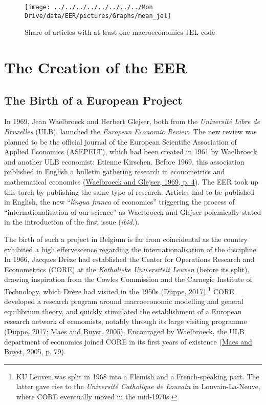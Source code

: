 \documentclass[
  12pt,
  onecolumn]{article}
\begin{document}
\begin{figure}[H]

{\centering \texttt{[image: ../../../../../../../../Mon Drive/data/EER/pictures/Graphs/mean\_jel]} 

}

\caption{Share of articles with at least one macroeconomics JEL code}\label{fig:plot-jel}
\end{figure}

\hypertarget{EER-creation}{%
\section{The Creation of the EER}\label{EER-creation}}

\hypertarget{the-birth-of-a-european-project}{%
\subsection{The Birth of a European Project}\label{the-birth-of-a-european-project}}

In 1969, Jean Waelbroeck and Herbert Glejser, both from the \emph{Université Libre de Bruxelles} (ULB), launched the \emph{European Economic Review}. The new review was planned to be the official journal of the European Scientific Association of Applied Economics (ASEPELT), which had been created in 1961 by Waelbroeck and another ULB economist: Etienne Kirschen. Before 1969, this association published in English a bulletin gathering research in econometrics and mathematical economics (\protect\hyperlink{ref-waelbroeck1969}{Waelbroeck and Glejser, 1969, p. 4}). The EER took up this torch by publishing the same type of research. Articles had to be published in English, the new ``\emph{lingua franca} of economics'' triggering the process of ``internationalisation of our science'' as Waelbroeck and Glejser polemically stated in the introduction of the first issue (\emph{ibid.}).

The birth of such a project in Belgium is far from coincidental as the country exhibited a high effervescence regarding the internationalisation of the discipline. In 1966, Jacques Drèze had established the Center for Operations Research and Econometrics (CORE) at the \emph{Katholieke Universiteit Leuven} (before its split), drawing inspiration from the Cowles Commission and the Carnegie Institute of Technology, which Drèze had visited in the 1950s (\protect\hyperlink{ref-duppe2017}{Düppe, 2017}).\footnote{KU Leuven was split in 1968 into a Flemish and a French-speaking part. The latter gave rise to the \emph{Université Catholique de Louvain} in Louvain-La-Neuve, where CORE eventually moved in the mid-1970s.} CORE developed a research program around macroeconomic modelling and general equilibrium theory, and quickly stimulated the establishment of a European research network of economists, notably through its large visiting programme (\protect\hyperlink{ref-duppe2017}{Düppe, 2017}; \protect\hyperlink{ref-maes2005}{Maes and Buyst, 2005}). Encouraged by Waelbroeck, the ULB department of economics joined CORE in its first years of existence (\protect\hyperlink{ref-maes2005}{Maes and Buyst, 2005, p. 79}).
\end{document}
